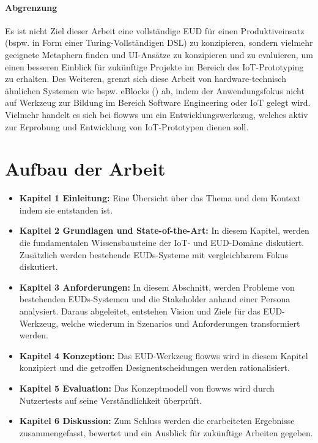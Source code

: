 \paragraph{Abgrenzung} Es ist nicht Ziel dieser Arbeit eine vollständige \ac{EUD} für einen Produktiveinsatz (bspw. in Form einer Turing-Vollständigen \ac{DSL}) zu konzipieren, sondern vielmehr geeignete Metaphern finden und \ac{UI}-Ansätze zu konzipieren und zu evaluieren, um einen besseren Einblick für zukünftige Projekte im Bereich des \ac{IoT}-Prototyping zu erhalten. Des Weiteren, grenzt sich diese Arbeit von hardware-technisch ähnlichen Systemen wie bspw. eBlocks (\cite{Phalke.2010}) ab, indem der Anwendungsfokus nicht auf Werkzeug zur Bildung im Bereich Software Engineering oder \ac{IoT} gelegt wird. Vielmehr handelt es sich bei flowws um ein Entwicklungswerkezug, welches aktiv zur Erprobung und Entwicklung von \ac{IoT}-Prototypen dienen soll.

\section{Aufbau der Arbeit}\label{sec:1_aufbau}
\begin{itemize}
    \item \textbf{Kapitel 1 Einleitung:} Eine Übersicht über das Thema und dem Kontext indem sie entstanden ist.
    \item \textbf{Kapitel 2 Grundlagen und State-of-the-Art:} In diesem Kapitel, werden die fundamentalen Wissensbausteine der \ac{IoT}- und \ac{EUD}-Domäne diskutiert. Zusätzlich werden bestehende \acp{EUD}-Systeme mit vergleichbarem Fokus diskutiert.
    \item \textbf{Kapitel 3 Anforderungen:} In diesem Abschnitt, werden Probleme von bestehenden \acp{EUD}-Systemen und die Stakeholder anhand einer Persona analysiert. Daraus abgeleitet, entstehen Vision und Ziele für das \ac{EUD}-Werkzeug, welche wiederum in Szenarios und Anforderungen transformiert werden.
    \item \textbf{Kapitel 4 Konzeption:} Das \ac{EUD}-Werkzeug flowws wird in diesem Kapitel konzipiert und die getroffen Designentscheidungen werden rationalisiert.
    \item \textbf{Kapitel 5 Evaluation:} Das Konzeptmodell von flowws wird durch Nutzertests auf seine Verständlichkeit überprüft.
    \item \textbf{Kapitel 6 Diskussion:} Zum Schluss werden die erarbeiteten Ergebnisse zusammengefasst, bewertet und ein Ausblick für zukünftige Arbeiten gegeben.
\end{itemize}